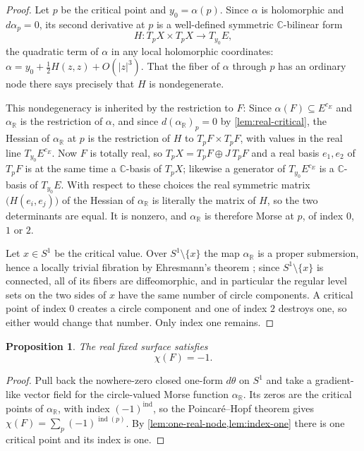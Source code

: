 \documentclass[11pt]{amsart}
\newtheorem{proposition}[theorem]{Proposition}
\theoremstyle{definition}
\theoremstyle{remark}
\newcommand{\R}{\mathbb R}
\newcommand{\C}{\mathbb C}
\begin{document}
\begin{proof}
Let $p$ be the critical point and $y_0=\alpha(p)$.  Since $\alpha$ is
holomorphic and $d\alpha_p=0$, its second derivative at $p$ is a well-defined
symmetric $\C$-bilinear form
\[
 H\colon T_pX\times T_pX\longrightarrow T_{y_0}E,
\]
the quadratic term of $\alpha$ in any local holomorphic coordinates:
$\alpha=y_0+\tfrac12H(z,z)+O(|z|^3)$.  That the fiber of $\alpha$ through $p$
has an ordinary node there says precisely that $H$ is nondegenerate.

This nondegeneracy is inherited by the
restriction to $F$:  Since $\alpha(F)\subseteq E^{c_E}$ and $\alpha_\R$ is the
restriction of $\alpha$, and since $d(\alpha_\R)_p=0$ by
\cref{lem:real-critical}, the Hessian of $\alpha_\R$ at $p$ is the
restriction of $H$ to $T_pF\times T_pF$, with values in the real line
$T_{y_0}E^{c_E}$.  Now $F$ is totally real, so $T_pX=T_pF\oplus J\,T_pF$ and
a real basis $e_1,e_2$ of $T_pF$ is at the same time a $\C$-basis of $T_pX$;
likewise a generator of $T_{y_0}E^{c_E}$ is a $\C$-basis of $T_{y_0}E$.  With
respect to these choices the real symmetric matrix
$\bigl(H(e_i,e_j)\bigr)$ of the Hessian of $\alpha_\R$ is literally the
matrix of $H$, so the two determinants are equal.  It is nonzero,
and $\alpha_\R$ is therefore Morse at $p$, of index $0$, $1$ or $2$.

Let $x\in S^1$ be the critical value.  Over $S^1\setminus\{x\}$ the map
$\alpha_\R$ is a proper submersion, hence a locally trivial fibration by
Ehresmann's theorem \cite{Ehresmann}; since $S^1\setminus\{x\}$ is connected, all of its
fibers are diffeomorphic, and in particular the regular level sets on the two
sides of $x$ have the same number of circle components.  A critical point of
index $0$ creates a circle component and one of index $2$ destroys one, so
either would change that number.  Only index one remains.
\end{proof}


\begin{proposition}\label{prop:chi-F}
The real fixed surface satisfies
\begin{equation}\label{eq:chi-F}
 \chi(F)=-1 .
\end{equation}
\end{proposition}

\begin{proof}
Pull back the nowhere-zero closed one-form $d\theta$ on $S^1$ and take a
gradient-like vector field for the circle-valued Morse function
$\alpha_\R$.  Its zeros are the critical points of $\alpha_\R$, with index
$(-1)^{\operatorname{ind}}$, so the Poincar\'e--Hopf theorem gives
$\chi(F)=\sum_p(-1)^{\operatorname{ind}(p)}$.  By
\cref{lem:one-real-node,lem:index-one} there is one critical point and its
index is one.
\end{proof}
\end{document}
